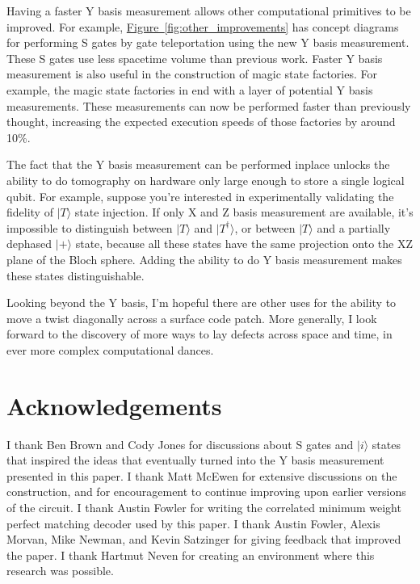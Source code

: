 \documentclass[onecolumn,unpublished,a4paper]{quantumarticle}
\theoremstyle{definition}
\theoremstyle{definition}
\theoremstyle{definition}
\newcommand{\fig}[1]{\hyperref[fig:#1]{Figure~\ref*{fig:#1}}}
\begin{document}
Having a faster Y basis measurement allows other computational primitives to be improved.
For example, \fig{other_improvements} has concept diagrams for performing S gates by gate teleportation using the new Y basis measurement.
These S gates use less spacetime volume than previous work.
Faster Y basis measurement is also useful in the construction of magic state factories.
For example, the magic state factories in \cite{fowler2018latticesurgery,gidney2019catalyzeddistillation} end with a layer of potential Y basis measurements.
These measurements can now be performed faster than previously thought, increasing the expected execution speeds of those factories by around 10\%.

The fact that the Y basis measurement can be performed inplace unlocks the ability to do tomography on hardware only large enough to store a single logical qubit.
For example, suppose you're interested in experimentally validating the fidelity of $|T\rangle$ state injection.
If only X and Z basis measurement are available, it's impossible to distinguish between $|T\rangle$ and $|T^\dagger\rangle$, or between $|T\rangle$ and a partially dephased $|+\rangle$ state, because all these states have the same projection onto the XZ plane of the Bloch sphere.
Adding the ability to do Y basis measurement makes these states distinguishable.

Looking beyond the Y basis, I'm hopeful there are other uses for the ability to move a twist diagonally across a surface code patch.
More generally, I look forward to the discovery of more ways to lay defects across space and time, in ever more complex computational dances.

\section{Acknowledgements}

I thank Ben Brown and Cody Jones for discussions about S gates and $|i\rangle$ states that inspired the ideas that eventually turned into the Y basis measurement presented in this paper.
I thank Matt McEwen for extensive discussions on the construction, and for encouragement to continue improving upon earlier versions of the circuit.
I thank Austin Fowler for writing the correlated minimum weight perfect matching decoder used by this paper.
I thank Austin Fowler, Alexis Morvan, Mike Newman, and Kevin Satzinger for giving feedback that improved the paper.
I thank Hartmut Neven for creating an environment where this research was possible.
\end{document}
